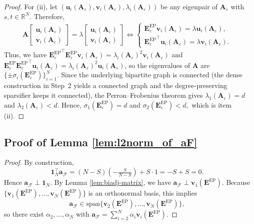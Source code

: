 \documentclass[lettersize,journal]{IEEEtran}
\newcommand{\adj}{\a}
\renewcommand{\u}{\boldsymbol{u}}
\renewcommand{\v}{\boldsymbol{v}}
\newcommand{\ones}[1]{\boldsymbol{1}_{#1}}
\newcommand{\F}{\mathcal{F}}
\newcommand{\GEP}{\boldsymbol{E}^{\mathrm{EP}}}
\renewcommand{\a}{\boldsymbol{a}}
\renewcommand{\adj}{\boldsymbol{A}}
\begin{document}
{\begin{proof}
For (ii), let $(\u_i(\adj_\varepsilon),\v_i(\adj_\varepsilon), \lambda_i(\adj_\varepsilon))$ be any eigenpair of $\adj_\varepsilon$ with $s,t\in\mathbb{R}^N$. Therefore,
\begin{align*}
   \adj
\begin{bmatrix}
\u_i(\adj_\varepsilon) \\
\v_i(\adj_\varepsilon)
\end{bmatrix}
=
\lambda
\begin{bmatrix}
\u_i(\adj_\varepsilon) \\
\v_i(\adj_\varepsilon)
\end{bmatrix}
\Longleftrightarrow
\begin{cases}
\GEP_\varepsilon\v_i(\adj_\varepsilon)=\lambda \u_i(\adj_\varepsilon),\\
{\GEP_\varepsilon}^\top \u_i(\adj_\varepsilon)=\lambda \v_i(\adj_\varepsilon).
\end{cases}
\end{align*}
Thus, we have
$
{\GEP_\varepsilon}^\top \GEP_\varepsilon \v_i(\adj_\varepsilon)=\lambda_i(\adj_\varepsilon)^2 \v_i(\adj_\varepsilon)
$ and $
\GEP_\varepsilon{\GEP_\varepsilon}^\top \u_i(\adj_\varepsilon)=\lambda_i(\adj_\varepsilon)^2 \u_i(\adj_\varepsilon)
$,
so the eigenvalues of $\adj$ are $\{\pm\sigma_i(\GEP_\varepsilon)\}_{i=1}^N$. Since the underlying bipartite graph is connected (the dense construction in Step~2 yields a connected graph and the degree-preserving sparsifier keeps it connected), the Perron–Frobenius theorem gives $\lambda_1(\adj_\varepsilon)=d$ and $\lambda_2(\adj_\varepsilon)<d$. Hence, $\sigma_1(\GEP_\varepsilon)=d$ and $\sigma_2(\GEP_\varepsilon)<d,$
which is item (ii).
\end{proof}

\subsection{Proof of Lemma \ref{lem:l2norm_of_aF}}
\label{proof of lem:l2norm_of_aF}
\begin{proof}
By construction,
\[
\ones{N}^\top \a_\F
= (N-S)\left(-\tfrac{S}{N-S}\right)+S\cdot 1
= -S+S
=0.
\]
Hence $\a_\F\perp\ones{N}$. By Lemma \ref{lem:biadj-matrix}, we have $\a_\F\perp\v_1(\GEP)$. Because
$\{\v_1(\GEP),\dots,\v_N(\GEP)\}$ is an orthonormal basis, this implies
\[
\a_\F\in \mathrm{span}\{\v_2(\GEP),\dots,\v_N(\GEP)\},
\]
so there exist $\alpha_2,\dots,\alpha_N$ with
$\a_\F=\sum_{i=2}^N \alpha_i\v_i(\GEP)$.


\end{proof}}
\end{document}
